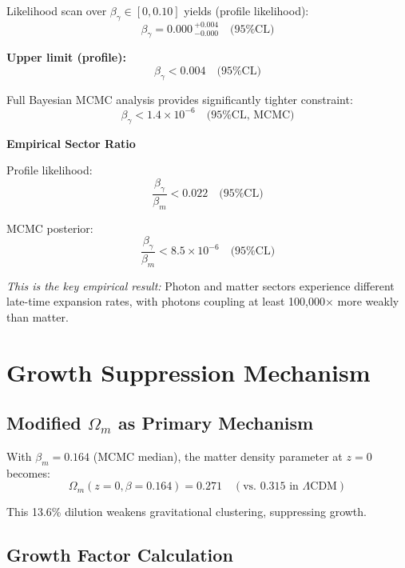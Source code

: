 \documentclass[twocolumn,superscriptaddress,prl,amsmath,amssymb]{revtex4-2}
\begin{document}
Likelihood scan over $\beta_\gamma \in [0, 0.10]$ yields (profile likelihood):
\begin{equation}
\beta_\gamma = 0.000\,^{+0.004}_{-0.000} \quad \text{(95\% CL)}
\end{equation}

\textbf{Upper limit (profile):}
\begin{equation}
\beta_\gamma < 0.004 \quad \text{(95\% CL)}
\end{equation}

Full Bayesian MCMC analysis provides significantly tighter constraint:
\begin{equation}
\beta_\gamma < 1.4 \times 10^{-6} \quad \text{(95\% CL, MCMC)}
\end{equation}

\textbf{Empirical Sector Ratio}

Profile likelihood:
\begin{equation}
\frac{\beta_\gamma}{\beta_m} < 0.022 \quad \text{(95\% CL)}
\end{equation}

MCMC posterior:
\begin{equation}
\frac{\beta_\gamma}{\beta_m} < 8.5 \times 10^{-6} \quad \text{(95\% CL)}
\label{eq:sector_ratio}
\end{equation}

\textit{This is the key empirical result:} Photon and matter sectors experience different late-time expansion rates, with photons coupling at least 100,000$\times$ more weakly than matter.

\section{Growth Suppression Mechanism}

\subsection{Modified $\Omega_m$ as Primary Mechanism}

With $\beta_m = 0.164$ (MCMC median), the matter density parameter at $z=0$ becomes:
\begin{equation}
\Omega_m(z=0, \beta=0.164) = 0.271 \quad (\text{vs. } 0.315 \text{ in } \Lambda\text{CDM})
\end{equation}

This 13.6\% dilution weakens gravitational clustering, suppressing growth.

\subsection{Growth Factor Calculation}
\end{document}
